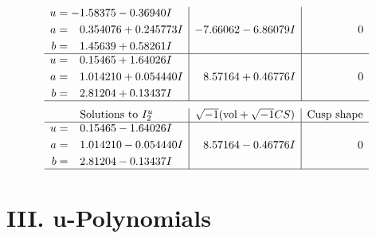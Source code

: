\documentclass[1p]{elsarticle_modified}
\theoremstyle{definition}
\newcommand{\I}{\sqrt{-1}}
\begin{document}
$$\begin{array}{c|c|c}
\begin{aligned}
u &= -1.58375 - 0.36940 I \\
a &= \phantom{-}0.354076 + 0.245773 I \\
b &= \phantom{-}1.45639 + 0.58261 I\end{aligned}
 & -7.66062 - 6.86079 I & \phantom{-0.000000 } 0 \\ \hline\begin{aligned}
u &= \phantom{-}0.15465 + 1.64026 I \\
a &= \phantom{-}1.014210 + 0.054440 I \\
b &= \phantom{-}2.81204 + 0.13437 I\end{aligned}
 & \phantom{-}8.57164 + 0.46776 I & \phantom{-0.000000 } 0\\
 \hline 
 \end{array}$$\newpage$$\begin{array}{c|c|c}  
\text{Solutions to }I^u_{2}& \I (\text{vol} + \sqrt{-1}CS) & \text{Cusp shape}\\
 \hline 
\begin{aligned}
u &= \phantom{-}0.15465 - 1.64026 I \\
a &= \phantom{-}1.014210 - 0.054440 I \\
b &= \phantom{-}2.81204 - 0.13437 I\end{aligned}
 & \phantom{-}8.57164 - 0.46776 I & \phantom{-0.000000 } 0\\
 \hline 
 \end{array}$$\newpage
\newpage\renewcommand{\arraystretch}{1}
\centering \section*{ III. u-Polynomials}
\end{document}

